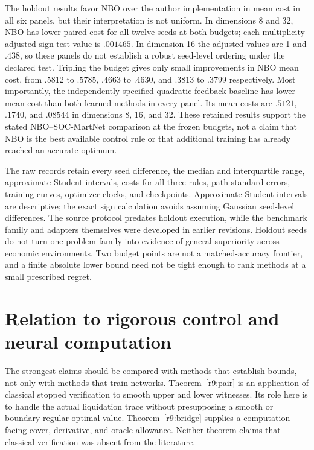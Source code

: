 The holdout results favor NBO over the author implementation in mean cost in all six panels, but their interpretation is not uniform. In dimensions 8 and 32, NBO has lower paired cost for all twelve seeds at both budgets; each multiplicity-adjusted sign-test value is $.001465$. In dimension 16 the adjusted values are 1 and $.438$, so these panels do not establish a robust seed-level ordering under the declared test. Tripling the budget gives only small improvements in NBO mean cost, from $.5812$ to $.5785$, $.4663$ to $.4630$, and $.3813$ to $.3799$ respectively. Most importantly, the independently specified quadratic-feedback baseline has lower mean cost than both learned methods in every panel. Its mean costs are $.5121$, $.1740$, and $.08544$ in dimensions 8, 16, and 32. These retained results support the stated NBO--SOC-MartNet comparison at the frozen budgets, not a claim that NBO is the best available control rule or that additional training has already reached an accurate optimum.

The raw records retain every seed difference, the median and interquartile range, approximate Student intervals, costs for all three rules, path standard errors, training curves, optimizer clocks, and checkpoints. Approximate Student intervals are descriptive; the exact sign calculation avoids assuming Gaussian seed-level differences. The source protocol predates holdout execution, while the benchmark family and adapters themselves were developed in earlier revisions. Holdout seeds do not turn one problem family into evidence of general superiority across economic environments. Two budget points are not a matched-accuracy frontier, and a finite absolute lower bound need not be tight enough to rank methods at a small prescribed regret.

\section{Relation to rigorous control and neural computation}\label{r9:related}
The strongest claims should be compared with methods that establish bounds, not only with methods that train networks. Theorem~\ref{r9:pair} is an application of classical stopped verification to smooth upper and lower witnesses. Its role here is to handle the actual liquidation trace without presupposing a smooth or boundary-regular optimal value. Theorem~\ref{r9:bridge} supplies a computation-facing cover, derivative, and oracle allowance. Neither theorem claims that classical verification was absent from the literature.

